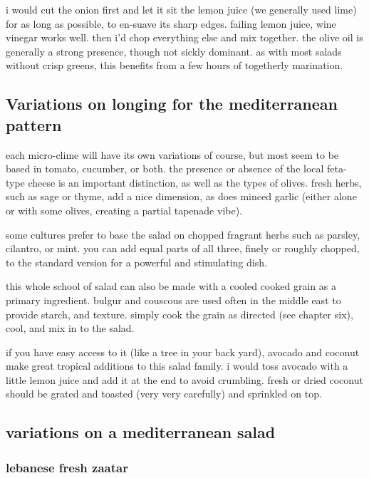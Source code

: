i would cut the onion first and let it sit the lemon juice (we generally used 
lime) for as long as possible, to en-suave its sharp edges. failing lemon 
juice, wine vinegar works well. then i'd chop everything else and mix together. 
the olive oil is generally a strong presence, though not sickly dominant. as 
with most salads without crisp greens, this benefits from a few hours of 
togetherly marination.

\subsection{Variations on longing for the mediterranean pattern}

each micro-clime will have its own variations of course, but most seem to be 
based in tomato, cucumber, or both. the presence or absence of the local 
feta-type cheese is an important distinction, as well as the types of olives. 
fresh herbs, such as sage or thyme, add a nice dimension, as does minced garlic 
(either alone or with some olives, creating a partial \gls{tapenade} vibe).

some cultures prefer to base the salad on chopped fragrant herbs such as 
parsley, cilantro, or mint. you can add equal parts of all three, finely or 
roughly chopped, to the standard version for a powerful and stimulating dish.

this whole school of salad can also be made with a cooled cooked grain as a 
primary ingredient. bulgur and couscous are used often in the middle east to 
provide starch, and texture. simply cook the grain as directed (see chapter 
six), cool, and mix in to the salad.

if you have easy access to it (like a tree in your back yard), avocado and 
coconut make great tropical additions to this salad family. i would toss 
avocado with a little lemon juice and add it at the end to avoid crumbling. 
fresh or dried coconut should be grated and toasted (very very carefully) and 
sprinkled on top.

\subsection{variations on a mediterranean salad}

\subsubsection{lebanese fresh zaatar}

